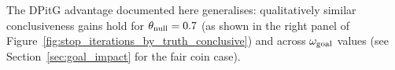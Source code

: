 
The DPitG advantage documented here generalises: qualitatively similar conclusiveness
gains hold for $\theta_{\rm null}=0.7$ (as shown in the right panel of
Figure~\ref{fig:stop_iterations_by_truth_conclusive}) and across $\omega_{\rm goal}$
values (see Section~\ref{sec:goal_impact} for the fair coin case).

